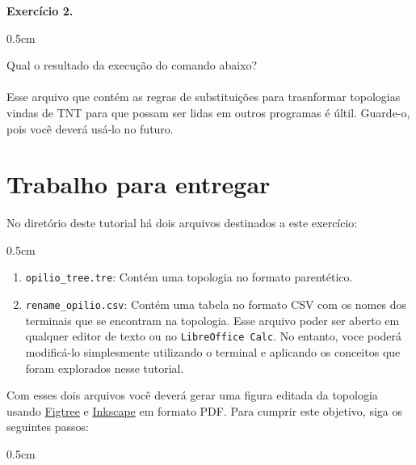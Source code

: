 \begin{refsection}
\begin{blackBlock}{\textbf{Exercício 2.}}
\begin {myindentpar}{0.5cm}
\begin{enumerate}[\itshape i.]
Qual o resultado da execução do comando abaixo?\\

\\

Esse arquivo que contém as regras de substituições para trasnformar topologias vindas de TNT para que possam ser lidas em outros programas é últil. Guarde-o, pois você deverá usá-lo no futuro.

\end{enumerate}
\end{myindentpar}

\end{blackBlock}


\section{Trabalho para entregar}\label{tut2:assigment}

No diretório deste tutorial há dois arquivos destinados a este exercício:\\

\begin {myindentpar}{0.5cm}
\begin{enumerate}[\itshape 1.]

 \item{\texttt{opilio\_tree.tre}:} Contém uma topologia no formato parentético.\\
 \item{\texttt{rename\_opilio.csv}:} Contém uma tabela no formato CSV com os nomes dos terminais que se encontram na topologia. Esse arquivo poder ser aberto em qualquer editor de texto ou no \texttt{LibreOffice Calc}. No entanto, voce poderá modificá-lo simplesmente utilizando o terminal e aplicando os conceitos que foram explorados nesse tutorial.\\

\end{enumerate}
\end{myindentpar}


Com esses dois arquivos você deverá gerar uma figura editada da topologia usando \href{http://tree.bio.ed.ac.uk/software/figtree/}{Figtree} e \href{https://inkscape.org/en/}{Inkscape} em formato PDF. Para cumprir este objetivo, siga os seguintes passos:

\begin {myindentpar}{0.5cm}
\begin{enumerate}[\itshape a.]


\end{enumerate}
\end{myindentpar}
\end{refsection}
